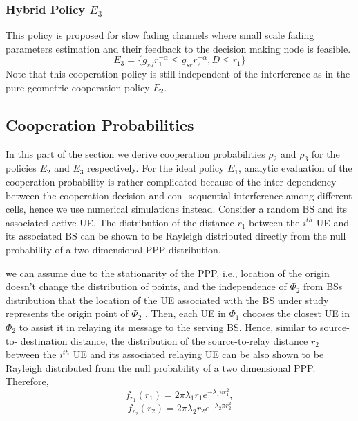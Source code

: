 \documentclass[titlepage]{article}
\begin{document}
\subsubsection{Hybrid Policy $E_3$}
This policy is proposed for slow fading channels where small scale fading parameters estimation and their
feedback to the decision making node is feasible. 
\begin{equation}
E_3 = \{g_{sd}r_1^{-\alpha} \leq g_{sr}r_2^{-\alpha}, D \leq r_1 \}
\end{equation}
Note that this cooperation policy is still independent of the
interference as in the pure geometric cooperation policy $E_2$.

\subsection{Cooperation Probabilities}
In this part of the section we derive cooperation probabilities $\rho_2$ and $\rho_3$ for the policies $E_2$ and $E_3$ respectively. For the ideal policy $E_1$, analytic evaluation of the
cooperation probability is rather complicated because of the
inter-dependency between the cooperation decision and con-
sequential interference among different cells, hence we use
numerical simulations instead. Consider a random BS and its associated active UE. 
The distribution of the distance
$r_1$ between the $i^{th}$ UE and its associated BS can be shown to
be Rayleigh distributed directly from the null probability of a
two dimensional PPP distribution. 
\par we can assume due to the stationarity of the
PPP, i.e., location of the origin doesn't change the distribution of points, and the independence of $\Phi_2$ from BSs distribution that
the location of the UE associated with the BS under study
represents the origin point of $\Phi_2$ . Then, each UE
in $\Phi_1$ chooses the closest UE in $\Phi_2$ to assist it in relaying
its message to the serving BS. Hence, similar to source-to-
destination distance, the distribution of the source-to-relay
distance $r_2$ between the $i^{th}$ UE and its associated relaying UE
can be also shown to be Rayleigh distributed from the null probability of a two dimensional PPP. Therefore,
\begin{equation*}
f_{r_1}(r_1) = 2\pi\lambda_1r_1e^{-\lambda_1\pi r_1^2},
\end{equation*}
\begin{equation}
f_{r_2}(r_2) = 2\pi\lambda_2r_2e^{-\lambda_2\pi r_2^2}
\end{equation}
\end{document}
